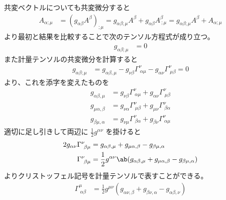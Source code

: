 \documentclass[uplatex,dvipdfmx,a4paper,11pt]{jlreq}
\theoremstyle{definition}
\begin{document}
共変ベクトルについても共変微分すると
\begin{align}
  A_{\alpha;\mu} & = (g_{\alpha\beta}A^{\beta})_{;\mu} = g_{\alpha\beta;\mu}A^{\beta} + g_{\alpha\beta}A^{\beta}_{\ ;\mu} = g_{\alpha\beta;\mu}A^{\beta} + A_{\alpha;\mu}
\end{align}
より最初と結果を比較することで次のテンソル方程式が成り立つ。
\begin{align}
  g_{\alpha\beta;\mu} & = 0
\end{align}
また計量テンソルの共変微分を計算すると
\begin{align}
  g_{\alpha\beta;\mu} & = g_{\alpha\beta,\mu} - g_{\nu\beta}\Gamma^\nu_{\ \alpha\mu} - g_{\alpha\nu}\Gamma^\nu_{\ \mu\beta} = 0
\end{align}
より、これを添字を変えたものを
\begin{align}
  g_{\alpha\beta,\mu} & = g_{\nu\beta}\Gamma^\nu_{\ \alpha\mu} + g_{\alpha\nu}\Gamma^\nu_{\ \mu\beta} \\
  g_{\mu\alpha,\beta} & = g_{\nu\alpha}\Gamma^\nu_{\ \mu\beta} + g_{\mu\nu}\Gamma^\nu_{\ \beta\alpha} \\
  g_{\beta\mu,\alpha} & = g_{\nu\mu}\Gamma^\nu_{\ \beta\alpha} + g_{\beta\nu}\Gamma^\nu_{\ \alpha\mu}
\end{align}
適切に足し引きして両辺に $\frac{1}{2}g^{\alpha\nu}$ を掛けると
\begin{align}
  2g_{\alpha\nu}\Gamma^\nu_{\ \beta\mu} & = g_{\alpha\beta,\mu} + g_{\mu\alpha,\beta} - g_{\beta\mu,\alpha}                              \\
  \Gamma^\nu_{\ \beta\mu}               & = \frac{1}{2}g^{\alpha\nu}\ab(g_{\alpha\beta,\mu} + g_{\mu\alpha,\beta} - g_{\beta\mu,\alpha})
\end{align}
よりクリストッフェル記号を計量テンソルで表すことができる。
\begin{align}
  \Gamma^\mu_{\ \alpha\beta} & = \frac{1}{2}g^{\mu\nu}(g_{\alpha\nu,\beta} + g_{\beta\nu,\alpha} - g_{\alpha\beta,\nu})
\end{align}
\end{document}

